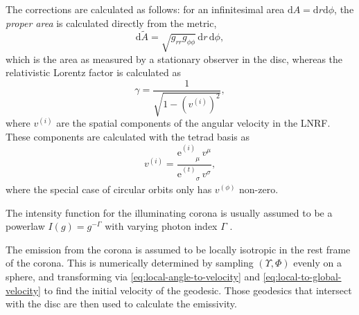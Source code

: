 \documentclass[fleqn,usenatbib]{mnras}
\newcommand{\e}{\text{e}}
\renewcommand{\d}{\text{d}}
\newcommand{\utensor}[3]{#1^{#2}_{\phantom{#2}#3}}
\begin{document}
The corrections are calculated as follows: for an infinitesimal area $\d A = \d r \d\phi$, the \textit{proper area} is calculated directly from the metric,
\begin{equation}
    \d\tilde{A} = \sqrt{g_{rr} g_{\phi\phi}}\, \d r\, \d \phi,
\end{equation}
which is the area as measured by a stationary observer in the disc, whereas the relativistic Lorentz factor is calculated as
\begin{equation}
    \gamma = \frac{1}{\sqrt{1 - \left(v^{(i)}\right)^2}},
\end{equation}
where $v^{(i)}$ are the spatial components of the angular velocity in the LNRF. These components are calculated with the tetrad basis as
\begin{equation}
    v^{(i)} = \frac{\utensor{\e}{(i)}{\mu}\, v^\mu}{\utensor{\e}{(t)}{\sigma}\, v^\sigma},
\end{equation}
where the special case of circular orbits only has $v^{(\phi)}$ non-zero.

The intensity function for the illuminating corona is usually assumed to be a powerlaw $I(g) = g^{-\Gamma}$ with varying photon index $\Gamma$ \citep{gonzalez_probing_2017}.

The emission from the corona is assumed to be locally isotropic in the rest frame of the corona. This is numerically determined by sampling $(\Upsilon, \Phi)$ evenly on a sphere, and transforming via \eqref{eq:local-angle-to-velocity} and \eqref{eq:local-to-global-velocity} to find the initial velocity of the geodesic. Those geodesics that intersect with the disc are then used to calculate the emissivity.
\end{document}
